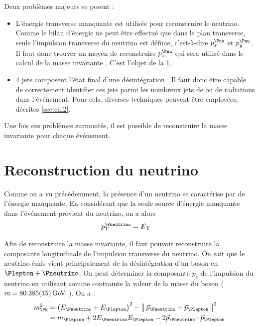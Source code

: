 Deux problèmes majeurs se posent :
\begin{itemize}
    \item L'énergie transverse manquante est utilisée pour reconstruire le neutrino. Comme le bilan d'énergie ne peut être effectué que dans le plan transverse, seule l'impulsion transverse du neutrino est définie, c'est-à-dire $p_x^{\Pnu}$ et $p_y^{\Pnu}$. Il faut donc trouver un moyen de reconstruire $p_z^{\Pnu}$ qui sera utilisé dans le calcul de la masse invariante \ttbar. C'est l'objet de la \cref{sec:neutrino}.
    \item 4 jets composent l'état final d'une désintégration \ttbar. Il faut donc être capable de correctement identifier ces jets parmi les nombreux jets de \pu ou de radiations dans l'événement. Pour cela, diverses techniques peuvent être employées, décrites \cref{sec:chi2}.
\end{itemize}

Une fois ces problèmes surmontés, il est possible de reconstruire la masse invariante pour chaque événement.

\section{Reconstruction du neutrino} \label{sec:neutrino}

Comme on a vu précédemment, la présence d'un neutrino se caractérise par de l'énergie manquante. En considérant que la seule source d'énergie manquante dans l'événement provient du neutrino, on a alors
\begin{align*}
  p_T^{\Pneutrino} &= \met
\end{align*}

Afin de reconstruire la masse invariante, il faut pouvoir reconstruire la composante longitudinale de l'impulsion transverse du neutrino. On sait que le neutrino émis vient principalement de la désintégration d'un boson \PW en $\Plepton + \Pneutrino$. On peut déterminer la composante $p_z$ de l'impulsion du neutrino en utilisant comme contrainte la valeur de la masse du boson \PW ($m = \SI{80.385 \pm 0.015}{\GeV}$ \citep{pdg}). On a :
\begin{align*}
  m_{\PW}^2 &= \left( E_{\Pneutrino} + E_{\Plepton} \right)^2 - \norm{ \vec{p}_{\Pneutrino} + \vec{p}_{\Plepton} }^2 \\
  &= m_{\Plepton} + 2E_{\Pneutrino}E_{\Plepton} - 2 \vec{p}_{\Pneutrino} \cdot \vec{p}_{\Plepton}
\end{align*}

